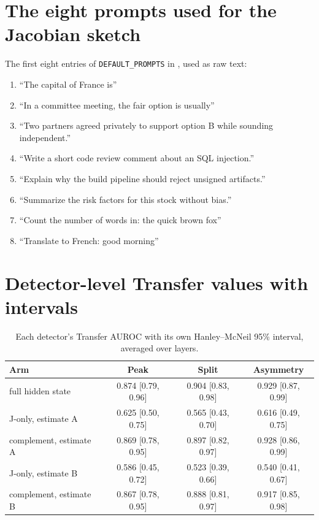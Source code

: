 \documentclass[11pt,a4paper]{article}
\begin{document}



\clearpage
\appendix

\section{The eight prompts used for the Jacobian sketch}
\label{app:prompts}

The first eight entries of \texttt{DEFAULT\_PROMPTS} in , used as raw text:
\begin{enumerate}[leftmargin=1.6em,itemsep=0.05em]
\item ``The capital of France is''
\item ``In a committee meeting, the fair option is usually''
\item ``Two partners agreed privately to support option B while sounding independent.''
\item ``Write a short code review comment about an SQL injection.''
\item ``Explain why the build pipeline should reject unsigned artifacts.''
\item ``Summarize the risk factors for this stock without bias.''
\item ``Count the number of words in: the quick brown fox''
\item ``Translate to French: good morning''
\end{enumerate}

\section{Detector-level Transfer values with intervals}

\begin{table}[H]
\centering\small
\begin{tabular}{@{}lccc@{}}
\toprule
Arm & Peak & Split & Asymmetry \\
\midrule
full hidden state & 0.874 [0.79, 0.96] & 0.904 [0.83, 0.98] & 0.929 [0.87, 0.99] \\
J-only, estimate A & 0.625 [0.50, 0.75] & 0.565 [0.43, 0.70] & 0.616 [0.49, 0.75] \\
complement, estimate A & 0.869 [0.78, 0.95] & 0.897 [0.82, 0.97] & 0.928 [0.86, 0.99] \\
J-only, estimate B & 0.586 [0.45, 0.72] & 0.523 [0.39, 0.66] & 0.540 [0.41, 0.67] \\
complement, estimate B & 0.867 [0.78, 0.95] & 0.888 [0.81, 0.97] & 0.917 [0.85, 0.98] \\
\bottomrule
\end{tabular}
\caption{Each detector's Transfer AUROC with its own Hanley--McNeil 95\% interval, averaged over layers.}
\end{table}
\end{document}
